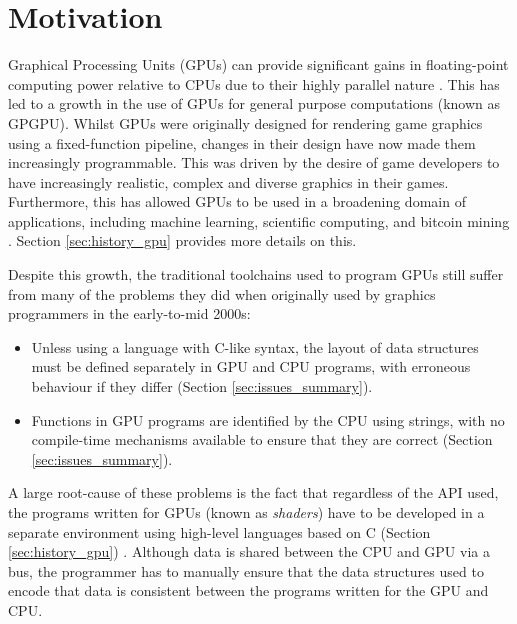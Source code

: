 \documentclass[a4paper,12pt,twoside,openright]{report}
\begin{document}
\section{Motivation}

\label{sec:motivation}

Graphical Processing Units (GPUs) can provide significant gains in
floating-point computing power relative to CPUs due to their highly parallel
nature \cite{CPUGPUOverTime}. This has led to a growth in the use of GPUs for
general purpose computations (known as GPGPU). Whilst GPUs were originally
designed for rendering game graphics using a fixed-function pipeline, changes
in their design have now made them increasingly programmable. This was driven
by the desire of game developers to have increasingly realistic, complex and
diverse graphics in their games. Furthermore, this has allowed GPUs to be used
in a broadening domain of applications, including machine learning, scientific
computing, and bitcoin mining \cite{GPUCrypto} \cite{GPUScientificComputing}
\cite{GPUAI}. Section \ref{sec:history_gpu} provides more details on this.


Despite this growth, the traditional toolchains used to program GPUs still
suffer from many of the problems they did when originally used by graphics
programmers in the early-to-mid 2000s:

\begin{itemize}

    \item Unless using a language with C-like syntax, the layout of data
    structures must be defined separately in GPU and CPU programs, with
    erroneous behaviour if they differ (Section \ref{sec:issues_summary}).

    \item Functions in GPU programs are identified by the CPU using strings,
    with no compile-time mechanisms available to ensure that they are correct
    (Section \ref{sec:issues_summary}).


\end{itemize}

A large root-cause of these problems is the fact that regardless of the API
used, the programs written for GPUs (known as \textit{shaders}) have to be
developed in a separate environment using high-level languages based on C
(Section \ref{sec:history_gpu}) \cite{TripThroughGraphicsPipeline1}. Although
data is shared between the CPU and GPU via a bus, the programmer has to
manually ensure that the data structures used to encode that data is consistent
between the programs written for the GPU and CPU.
\end{document}
